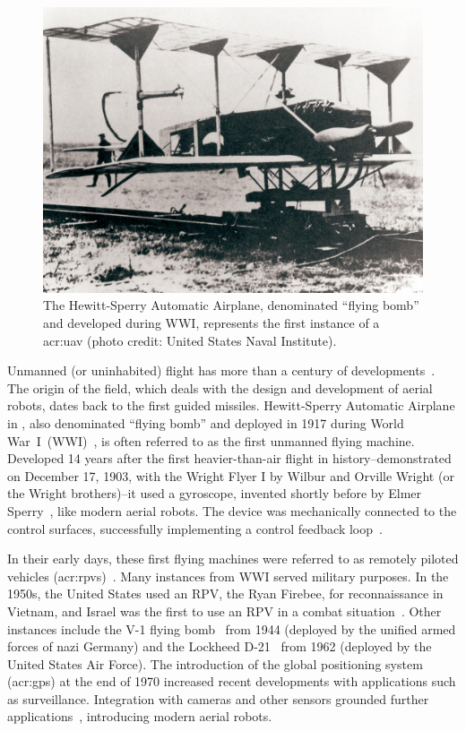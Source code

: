 \begin{figure}[t]
  \centering
  \includegraphics[width=.7\textwidth]{pictures/HA-NH-JA-19_1}
  \caption[Hewitt-Sperry Automatic Airplane, the first unmanned flying machine]{The Hewitt-Sperry Automatic Airplane, denominated ``flying bomb'' and developed during WWI, represents the first instance of a \Gls{acr:uav} {\scriptsize(photo credit: United States Naval Institute)}.}   
  \label{fig:hewitt-sperry}
\end{figure}
Unmanned (or uninhabited) flight has more than a century of developments~\citep{siciliano2016springer}. The origin of the field, which deals with the design and development of aerial robots, dates back to the first guided missiles. Hewitt-Sperry Automatic Airplane in , also denominated ``flying bomb'' and deployed in 1917 during World War~I~(WWI)~\citep{keane2013brief,valavanis2015handbook}, is often referred to as the first unmanned flying machine. Developed 14 years after the first heavier-than-air flight in history--demonstrated on December 17, 1903, with the Wright Flyer I by Wilbur and Orville Wright (or the Wright brothers)--it used a gyroscope, invented shortly before by Elmer Sperry~\citep{keane2013brief}, like modern aerial robots. The device was mechanically connected to the control surfaces, successfully implementing a control feedback loop~\citep{siciliano2016springer}.

In their early days, these first flying machines were referred to as remotely piloted vehicles (\Gls{acr:rpv}s)~\citep{anderson2005introduction}. Many instances from WWI served military purposes. In the 1950s, the United States used an RPV, the Ryan Firebee, for reconnaissance in Vietnam, and Israel was the first to use an RPV in a combat situation~\citep{anderson2005introduction}. Other instances include the V-1 flying bomb~ from 1944 (deployed by the unified armed forces of nazi Germany) and the Lockheed D-21~ from 1962 (deployed by the United States Air Force). The introduction of the global positioning system (\Gls{acr:gps}) at the end of 1970 increased recent developments with applications such as surveillance. Integration with cameras and other sensors grounded further applications~\citep{siciliano2016springer}, introducing modern aerial robots.

